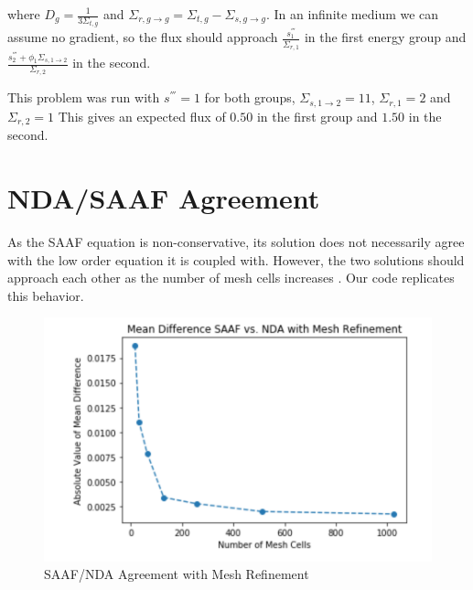 where $D_g = \frac{1}{3\Sigma_{t, g}}$ and $\Sigma_{r, g \rightarrow g} = \Sigma_{t, g} - \Sigma_{s, g \rightarrow g}$. In an infinite medium we can assume no gradient, so the flux should approach $\frac{s_1^{'''}}{\Sigma_{r, 1}}$ in the first energy group and $\frac{s_2^{'''} + \phi_1 \Sigma_{s, 1 \rightarrow 2}}{\Sigma_{r, 2}}$ in the second.  

This problem was run with $ s^{'''} = 1$ for both groups, $\Sigma_{s, 1\rightarrow 2} = 11$, $\Sigma_{r, 1} = 2$ and $\Sigma_{r, 2} = 1$ This gives an expected flux of $0.50 $ in the first group and $1.50$ in the second. 

\section{NDA/SAAF Agreement}
As the SAAF equation is non-conservative, its solution does not necessarily agree with the low order equation it is coupled with. However, the two solutions should approach each other as the number of mesh cells increases \cite{Wang2013}. Our code replicates this behavior. 
\begin{figure}
    \centering
    \includegraphics[width=.75\textwidth]{fig/SAAFvsNDA}
    \caption{SAAF/NDA Agreement with Mesh Refinement}
    \label{fig:SAAFvsNDA}
\end{figure}